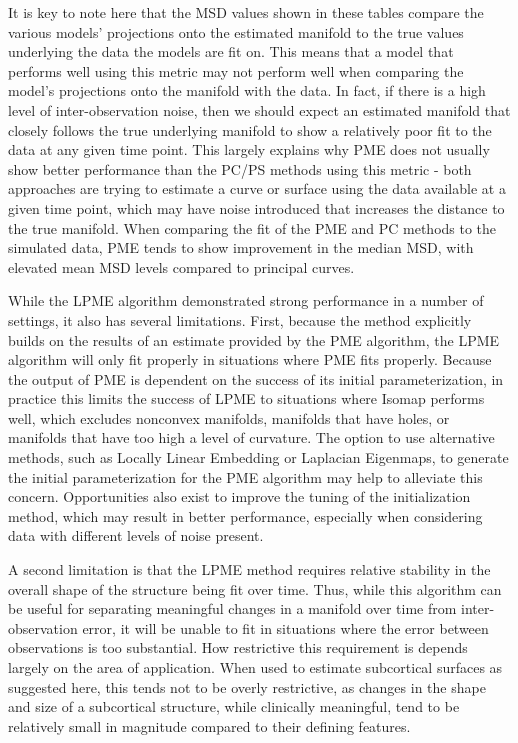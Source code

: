 \documentclass[11pt,reqno]{article}
\theoremstyle{definition}
\begin{document}
It is key to note here that the MSD values shown in these tables compare the various models' projections onto the estimated manifold to the true values underlying the data the models are fit on. This means that a model that performs well using this metric may not perform well when comparing the model's projections onto the manifold with the data. In fact, if there is a high level of inter-observation noise, then we should expect an estimated manifold that closely follows the true underlying manifold to show a relatively poor fit to the data at any given time point. This largely explains why PME does not usually show better performance than the PC/PS methods using this metric - both approaches are trying to estimate a curve or surface using the data available at a given time point, which may have noise introduced that increases the distance to the true manifold. When comparing the fit of the PME and PC methods to the simulated data, PME tends to show improvement in the median MSD, with elevated mean MSD levels compared to principal curves.

While the LPME algorithm demonstrated strong performance in a number of settings, it also has several limitations. First, because the method explicitly builds on the results of an estimate provided by the PME algorithm, the LPME algorithm will only fit properly in situations where PME fits properly. Because the output of PME is dependent on the success of its initial parameterization, in practice this limits the success of LPME to situations where Isomap performs well, which excludes nonconvex manifolds, manifolds that have holes, or manifolds that have too high a level of curvature. The option to use alternative methods, such as Locally Linear Embedding or Laplacian Eigenmaps, to generate the initial parameterization for the PME algorithm may help to alleviate this concern. Opportunities also exist to improve the tuning of the initialization method, which may result in better performance, especially when considering data with different levels of noise present.

A second limitation is that the LPME method requires relative stability in the overall shape of the structure being fit over time. Thus, while this algorithm can be useful for separating meaningful changes in a manifold over time from inter-observation error, it will be unable to fit in situations where the error between observations is too substantial. How restrictive this requirement is depends largely on the area of application. When used to estimate subcortical surfaces as suggested here, this tends not to be overly restrictive, as changes in the shape and size of a subcortical structure, while clinically meaningful, tend to be relatively small in magnitude compared to their defining features.
\end{document}
